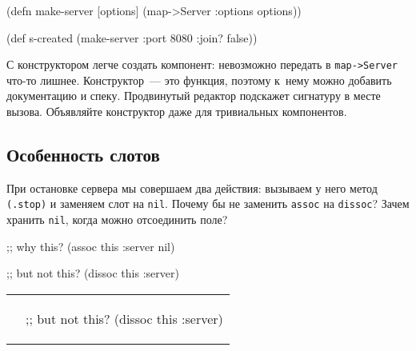 \else

\begin{english}
  \begin{clojure}
(defn make-server
  [options]
  (map->Server {:options options}))

(def s-created (make-server {:port 8080 :join? false}))
  \end{clojure}
\end{english}

\fi

С конструктором легче создать компонент: невозможно передать в
\verb|map->Server| что-то лишнее. Конструктор~--- это функция, поэтому к~нему
можно добавить документацию и спеку. Продвинутый редактор подскажет сигнатуру в
месте вызова. Объявляйте конструктор даже для тривиальных компонентов.

\subsection{Особенность слотов}

При остановке сервера мы совершаем два действия: вызываем у него метод
\verb|(.stop)| и заменяем слот на \verb|nil|. Почему бы не заменить
\verb|assoc| на \verb|dissoc|? Зачем хранить \verb|nil|, когда можно
отсоединить поле?

\ifnarrow

\begin{english}
  \begin{clojure}
;; why this?
(assoc this :server nil)

;; but not this?
(dissoc this :server)
  \end{clojure}
\end{english}

\else

\begin{english}

\noindent
\iflarge
\begin{tabular}{ @{}p{5.5cm} @{}p{5cm} }
\else
\begin{tabular}{ @{}p{5cm} @{}p{5cm} }
\fi

  \begin{clojure}
;; why this?
(assoc this :server nil)
  \end{clojure}

&

  \begin{clojure}
;; but not this?
(dissoc this :server)
  \end{clojure}

\end{tabular}

\end{english}

